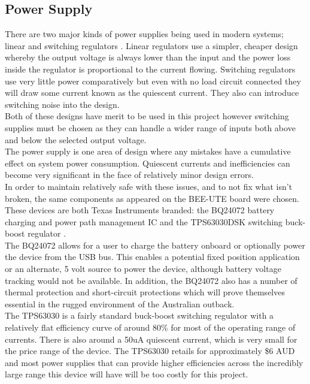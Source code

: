 \documentclass[12pt,openany,a4paper]{book}
\begin{document}
		\subsection{Power Supply}

		There are two major kinds of power supplies being used in modern systems; linear and switching regulators \cite{TI2011}. Linear regulators use a simpler, cheaper design whereby the output voltage is always lower than the input and the power loss inside the regulator is proportional to the current flowing. Switching regulators use very little power comparatively but even with no load circuit connected they will draw some current known as the quiescent current. They also can introduce switching noise into the design. \\
		
		Both of these designs have merit to be used in this project however switching supplies must be chosen as they can handle a wider range of inputs both above and below the selected output voltage. \\
					
		The power supply is one area of design where any mistakes have a cumulative effect on system power consumption. Quiescent currents and inefficiencies can become very significant in the face of relatively minor design errors. \\
		
		In order to maintain relatively safe with these issues, and to not fix what isn't broken, the same components as appeared on the BEE-UTE board were chosen. These devices are both Texas Instruments branded: the BQ24072 battery charging and power path management IC \cite{TIUSB} and the TPS63030DSK switching buck-boost regulator \cite{TIBUCK}. \\
		
		The BQ24072 allows for a user to charge the battery onboard or optionally power the device from the USB bus. This enables a potential fixed position application or an alternate, 5 volt source to power the device, although battery voltage tracking would not be available. In addition, the BQ24072 also has a number of thermal protection and short-circuit protections which will prove themselves essential in the rugged environment of the Australian outback. \\%
		
		The TPS63030 is a fairly standard buck-boost switching regulator with a relatively flat efficiency curve of around 80\% for most of the operating range of currents. There is also around a 50uA quiescent current, which is very small for the price range of the device. The TPS63030 retails for approximately \$6 AUD and most power supplies that can provide higher efficiencies across the incredibly large range this device will have will be too costly for this project. \\
		
\end{document}
